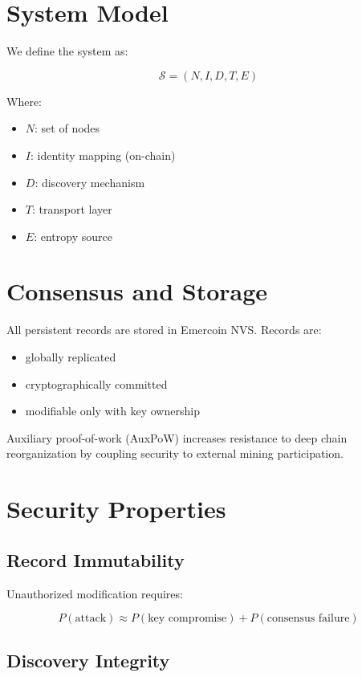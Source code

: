 \documentclass[11pt]{article}
\begin{document}
\section{System Model}

We define the system as:

\[
\mathcal{S} = (N, I, D, T, E)
\]

Where:
\begin{itemize}
    \item $N$: set of nodes
    \item $I$: identity mapping (on-chain)
    \item $D$: discovery mechanism
    \item $T$: transport layer
    \item $E$: entropy source
\end{itemize}

\section{Consensus and Storage}

All persistent records are stored in Emercoin NVS. Records are:
\begin{itemize}
    \item globally replicated
    \item cryptographically committed
    \item modifiable only with key ownership
\end{itemize}

Auxiliary proof-of-work (AuxPoW) increases resistance to deep chain reorganization by coupling security to external mining participation.

\section{Security Properties}

\subsection{Record Immutability}

Unauthorized modification requires:

\[
P(\text{attack}) \approx P(\text{key compromise}) + P(\text{consensus failure})
\]

\subsection{Discovery Integrity}
\end{document}
